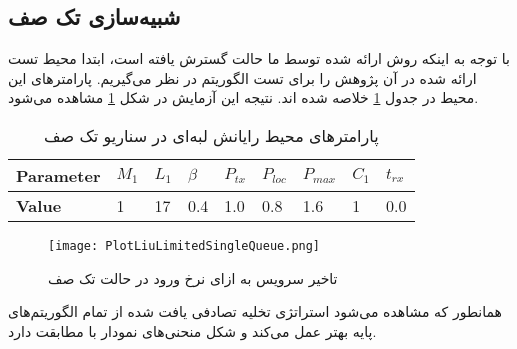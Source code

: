 \subsection{شبیه‌سازی تک صف}
با توجه به اینکه روش ارائه شده توسط ما حالت گسترش یافته \cite{Liu} است، ابتدا محیط تست ارائه شده در آن پژوهش را برای تست الگوریتم در نظر می‌گیریم. پارامترهای این محیط در جدول \ref{table:parameters-singlequeue} خلاصه شده اند. نتیجه این آزمایش در شکل \ref{plot:singleQueue} مشاهده می‌شود.

\begin{table}
	\centering
	\begin{latin}
		\begin{tabular}{@{}lllllllll@{}}
			\toprule
			\textbf{Parameter} & $M_1$ & $L_1$ & $\beta$ & $P_{tx}$ & $P_{loc}$ & $P_{max}$ & $C_1$ & $t_{rx}$ \\ \midrule
			\textbf{Value}             & 1    & 17   & 0.4  & 1.0 & 0.8  & 1.6  & 1    & 0.0   \\ \bottomrule
		\end{tabular}
	\end{latin}
	\caption{پارامترهای محیط رایانش لبه‌ای در سناریو تک صف}
	\label{table:parameters-singlequeue}
\end{table}

\begin{figure}
	\centering
	\texttt{[image: PlotLiuLimitedSingleQueue.png]}
	\caption{تاخیر سرویس به ازای نرخ ورود در حالت تک صف}
	\label{plot:singleQueue}
\end{figure}
همانطور که مشاهده می‌شود استراتژی تخلیه تصادفی یافت شده از تمام الگوریتم‌های پایه بهتر عمل می‌کند و شکل منحنی‌های نمودار با \cite{Liu} مطابقت دارد.
